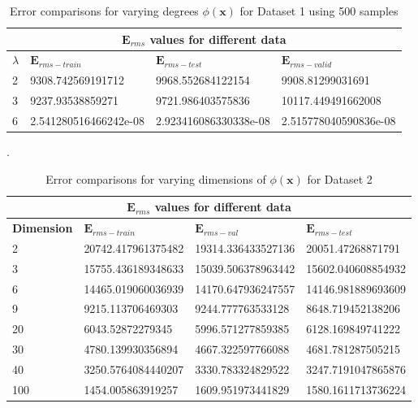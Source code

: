 {\begin{table}[p]
\vspace*{\floatsep}
 \begin{tabular}{ |p{1.5cm}|p{3cm}|p{3cm}| p{3cm}|  }
\hline
\multicolumn{4}{|c|}{$\mathbf{E}_{rms}$ values for different data } \\
\hline
\rowcolor{lightgray} \textbf{$\lambda$} & $\mathbf{E}_{rms-train}$ & $\mathbf{E}_{rms-test}$ & $\mathbf{E}_{rms-valid}$ \\
\hline
 2   &   9308.742569191712  &  9968.552684122154 & 9908.81299031691   \\   
 \hline
 3   &   9237.93538859271   &   9721.986403575836  &   10117.449491662008    \\
 \hline
 6   &   2.541280516466242e-08   &    2.923416086330338e-08     &     2.515778040590836e-08  \\
\hline
\end{tabular}
\caption{Error comparisons for varying degrees $\phi(\mathbf{x}) $ for Dataset 1 using 500 samples}.
\label{table:7}
\end{table}
}

{
\begin{table}[hptb]
\begin{tabular}{ |p{1.5cm}|p{3cm}|p{3cm}| p{3cm}|  }
\hline
\multicolumn{4}{|c|}{$\mathbf{E}_{rms}$ values for different data } \\
\hline
\rowcolor{lightgray} \textbf{Dimension} & $\mathbf{E}_{rms-train}$ & $\mathbf{E}_{rms-val}$ & $\mathbf{E}_{rms-test}$ \\
\hline
  2   &   20742.417961375482    &       19314.336433527136    &     20051.47268871791   \\
 \hline
 3   &   15755.436189348633    &       15039.506378963442    &     15602.040608854932   \\   
 \hline
 6   &   14465.019060036939    &       14170.647936247557    &     14146.981889693609         \\
 \hline
 9   &   9215.113706469303     &       9244.777763533128     &     8648.719452138206     \\
 \hline
 20  &   6043.52872279345      &       5996.571277859385     &     6128.169849741222     \\
 \hline
 30  &   4780.139930356894     &       4667.322597766088     &     4681.781287505215      \\
 \hline
 40  &   3250.5764084440207    &       3330.783324829522     &     3247.7191047865876     \\  
 \hline
 100 &   1454.005863919257     &       1609.951973441829     &     1580.1611713736224     \\
\hline
\end{tabular}
\caption{Error comparisons for varying dimensions of $\phi(\mathbf{x}) $ for Dataset 2}
\label{table:8}
\end{table}
}

